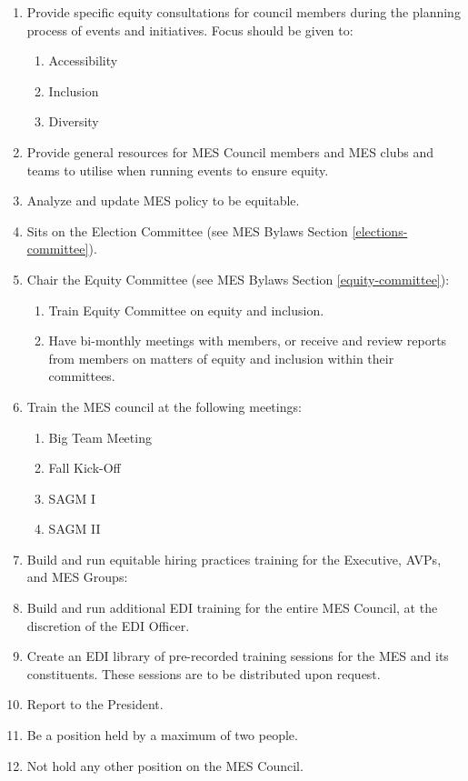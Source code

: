 \begin{enumerate}
 \item
  Provide specific equity consultations for council members during the
  planning process of events and initiatives. Focus should be given to:

  \begin{enumerate}
   \item
    Accessibility
   \item
    Inclusion
   \item
    Diversity
  \end{enumerate}
 \item
  Provide general resources for MES Council members and MES clubs and
  teams to utilise when running events to ensure equity.
 \item
  Analyze and update MES policy to be equitable.
 \item
  Sits on the Election Committee (see MES Bylaws Section \ref{elections-committee}).
 \item
  Chair the Equity Committee (see MES Bylaws Section \ref{equity-committee}):

  \begin{enumerate}
   \item
    Train Equity Committee on equity and inclusion.
   \item
    Have bi-monthly meetings with members, or receive and review reports
    from members on matters of equity and inclusion within their
    committees.
  \end{enumerate}
 \item
  Train the MES council at the following meetings:

  \begin{enumerate}
   \item
    Big Team Meeting
   \item
    Fall Kick-Off
   \item
    SAGM I
   \item
    SAGM II
  \end{enumerate}
 \item
  Build and run equitable hiring practices training for the Executive,
  AVPs, and MES Groups:
 \item
  Build and run additional EDI training for the entire MES Council, at
  the discretion of the EDI Officer.
 \item
  Create an EDI library of pre-recorded training sessions for the MES
  and its constituents. These sessions are to be distributed upon
  request.
 \item
  Report to the President.
 \item
  Be a position held by a maximum of two people.
 \item
  Not hold any other position on the MES Council.

\end{enumerate}

